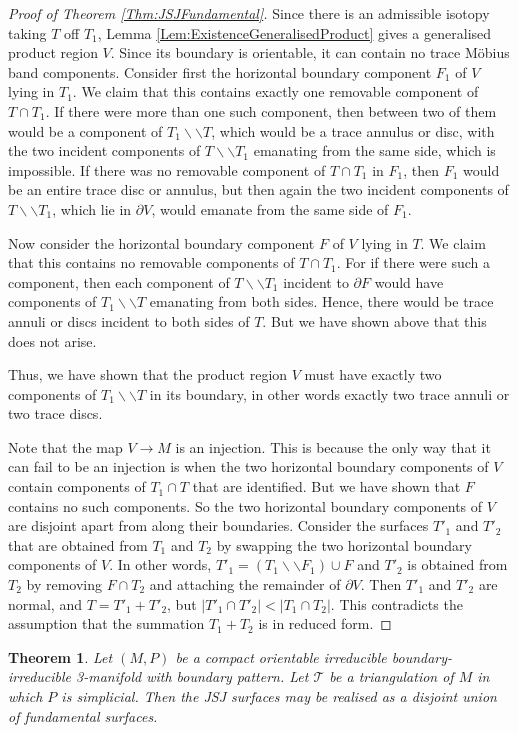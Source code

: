 \documentclass[oneside]{amsart}
\numberwithin{equation}{section}
\theoremstyle{plain}
\newtheorem{theorem}[equation]{Theorem}
\theoremstyle{definition}
\newcommand{\cut}{\backslash\backslash}
\begin{document}
\begin{proof}[Proof of Theorem \ref{Thm:JSJFundamental}]
Since there is an admissible isotopy taking $T$ off $T_1$, Lemma \ref{Lem:ExistenceGeneralisedProduct} gives a generalised product region $V$. Since its boundary is orientable, it can contain no trace M\"obius band components. Consider first the horizontal boundary component $F_1$ of $V$ lying in $T_1$. We claim that this contains exactly one removable component of $T \cap T_1$. If there were more than one such component, then between two of them would be a component of $T_1 \cut T$, which would be a trace annulus or disc, with the two incident components of $T \cut T_1$ emanating from the same side, which is impossible. If there was no removable component of $T \cap T_1$ in $F_1$, then $F_1$ would be an entire trace disc or annulus, but then again the two incident components of $T \cut T_1$, which lie in $\partial V$, would emanate from the same side of $F_1$.

Now consider the horizontal boundary component $F$ of $V$ lying in $T$. We claim that this contains no removable components of $T \cap T_1$. For if there were such a component, then each component of $T \cut T_1$ incident to $\partial F$ would have components of $T_1 \cut T$ emanating from both sides. Hence, there would be trace annuli or discs incident to both sides of $T$. But we have shown above that this does not arise.

Thus, we have shown that the product region $V$ must have exactly two components of $T_1 \cut T$ in its boundary, in other words exactly two trace annuli or two trace discs.

Note that the map $V \rightarrow M$ is an injection. This is because the only way that it can fail to be an injection is when the two horizontal boundary components of $V$ contain components of $T_1 \cap T$ that are identified. But we have shown that $F$ contains no such components. So the two horizontal boundary components of $V$ are disjoint apart from along their boundaries. Consider the surfaces $T'_1$ and $T'_2$ that are obtained from $T_1$ and $T_2$ by swapping the two horizontal boundary components of $V$. In other words, $T'_1 = (T_1 \cut F_1) \cup F$ and $T'_2$ is obtained from $T_2$ by removing $F \cap T_2$ and attaching the remainder of $\partial V$. Then $T'_1$ and $T'_2$ are normal, and $T = T'_1 + T'_2$, but $|T'_1 \cap T'_2| < |T_1 \cap T_2|$. This contradicts the assumption that the summation $T_1 + T_2$ is in reduced form.
\end{proof}

\begin{theorem}
\label{Thm:JSJUnionFundamental}
Let $(M,P)$ be a compact orientable irreducible boundary-irreducible 3-manifold with boundary pattern.
Let $\mathcal{T}$ be a triangulation of $M$ in which $P$ is simplicial. Then the JSJ surfaces 
may be realised as a disjoint union of fundamental surfaces.
\end{theorem}
\end{document}
